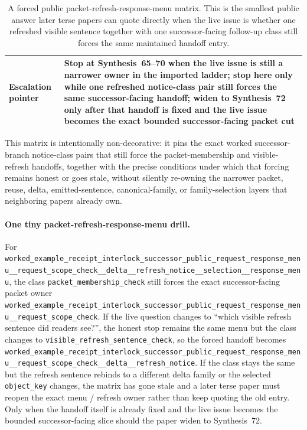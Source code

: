 \documentclass[11pt]{article}
\begin{document}
\begin{table}[t]
\begin{tabularx}{\linewidth}{@{}lX@{}}
Escalation pointer & Stop at Synthesis~65--70 when the live issue is still a narrower owner in the imported ladder; stop here only while one refreshed notice-class pair still forces the same successor-facing handoff; widen to Synthesis~72 only after that handoff is fixed and the live issue becomes the exact bounded successor-facing packet cut \\
\bottomrule
\end{tabularx}
\caption{A forced public packet-refresh-response-menu matrix. This is the smallest public answer later terse papers can quote directly when the live issue is whether one refreshed visible sentence together with one successor-facing follow-up class still forces the same maintained handoff entry.}
\label{tab:forced-public-packet-refresh-response-menu-matrix}
\end{table}

This matrix is intentionally non-decorative: it pins the exact worked successor-branch notice-class pairs that still force the packet-membership and visible-refresh handoffs, together with the precise conditions under which that forcing remains honest or goes stale, without silently re-owning the narrower packet, reuse, delta, emitted-sentence, canonical-family, or family-selection layers that neighboring papers already own.\cite{series:workedexample}

\paragraph{One tiny packet-refresh-response-menu drill.}
For \nolinkurl{worked_example_receipt_interlock_successor_public_request_response_menu__request_scope_check__delta__refresh_notice__selection__response_menu}, the class \nolinkurl{packet_membership_check} still forces the exact successor-facing packet owner \nolinkurl{worked_example_receipt_interlock_successor_public_request_response_menu__request_scope_check}. If the live question changes to ``which visible refresh sentence did readers see?'', the honest stop remains the same menu but the class changes to \nolinkurl{visible_refresh_sentence_check}, so the forced handoff becomes \nolinkurl{worked_example_receipt_interlock_successor_public_request_response_menu__request_scope_check__delta__refresh_notice}. If the class stays the same but the refresh sentence rebinds to a different delta family or the selected \nolinkurl{object_key} changes, the matrix has gone stale and a later terse paper must reopen the exact menu / refresh owner rather than keep quoting the old entry. Only when the handoff itself is already fixed and the live issue becomes the bounded successor-facing slice should the paper widen to Synthesis~72.\cite{series:workedexample}
\end{document}
